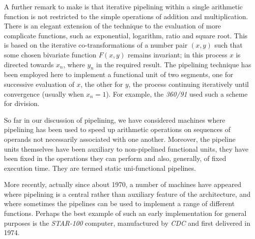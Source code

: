 \documentclass[a4paper,12pt]{article}
\begin{document}
   A further remark to make is that iterative pipelining within a
single arithmetic function is not restricted to the simple
operations of addition and multiplication. There is an elegant
extension of the technique to the evaluation of more complicate
functions, such as exponential, logarithm, ratio and square
root. This is based on the iterative co-transformations of a number
pair $(x,y)$ such that some chosen bivariate function $F(x,y)$
remains invariant; in this process $x$ is directed towards $x_n$,
where $y_n$ in the required result. The pipelining technique has been
employed here to implement a functional unit of two segments, one for
successive evaluation of $x$, the other for $y$, the process
continuing iteratively until convergence (usually when $x_n=1$). For
example, the \textit{360/91} used such a scheme for division.\medskip

   So far in our discussion of pipelining, we have considered machines
where pipelining has been used to speed up arithmetic operations on
sequences of operands not necessarily associated with one
another. Moreover, the pipeline units themselves have been
auxiliary to non-pipelined functional units, they have been fixed
in the operations they can perform and also, generally, of fixed
execution time. They are termed static uni-functional pipelines.

   More recently, actually since about 1970, a number of machines have
appeared where pipelining is a central rather than auxiliary
feature of the architecture, and where sometimes the pipelines can
be used to implement a range of different functions. Perhaps the
best example of such an early implementation for general purposes
is the \textit{STAR-100} computer, manufactured by \textit{CDC} and
first delivered in 1974. 
\end{document}
